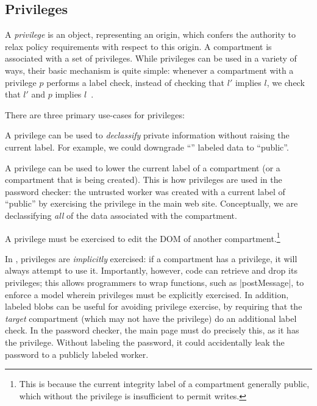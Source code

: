 \subsection{Privileges}
\label{sec:privileges}

A \emph{privilege} is an object, representing an origin, which confers
the authority to relax policy requirements with respect to this origin.
%
A compartment is associated with a set of privileges.
%
While privileges can be used in a variety of ways, their basic mechanism
is quite simple:  whenever a compartment with a privilege $p$ performs a
label check, instead of checking that $l'$ implies $l$, we check that
$l'$ and $p$ implies $l$~\cite{stefan:2011:dclabels}.

There are three primary use-cases for privileges:

\begin{CompactItemize}
    \item A privilege can be used to \emph{declassify} private
        information without raising the current label.  For example, we
        could downgrade ``'' labeled data to
        ``public''.

    \item A privilege can be used to lower the current label of
        a compartment (or a compartment that is being created).
        This is how privileges are used
        in the password checker: the untrusted worker was created
        with a current label of ``public'' by exercising the
         privilege in the main web site.  Conceptually, we
        are declassifying \emph{all} of the data associated with the
        compartment.

    \item A privilege must be exercised to edit the DOM
        of another compartment.\footnote{This is because the current
        integrity label of a compartment generally public, which
        without the privilege is insufficient to permit writes.}
\end{CompactItemize}

In \sys{}, privileges are \emph{implicitly} exercised: if a compartment
has a privilege, it will always attempt to use it.
%
Importantly, however, code can retrieve and drop its privileges; this
allows programmers to wrap functions, such as \js|postMessage|, to
enforce a model wherein privileges must be explicitly exercised.
%
In addition, labeled blobs can be useful for avoiding privilege
exercise, by requiring that the \emph{target} compartment (which may
not have the privilege) do an additional label check.
%
In the password checker, the main
page must do precisely this, as it has the  privilege.
%
Without labeling the password, it could accidentally leak the password
to a publicly labeled worker.

